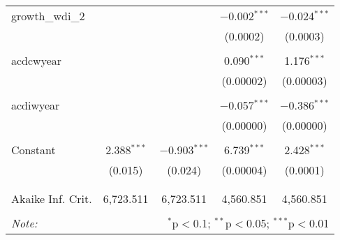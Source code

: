 \begin{table}[!htbp]
\begin{tabular}{@{\extracolsep{5pt}}lcccc}
 growth\_wdi\_2 &  &  & $-$0.002$^{***}$ & $-$0.024$^{***}$ \\ 
  &  &  & (0.0002) & (0.0003) \\ 
  & & & & \\ 
 acdcwyear &  &  & 0.090$^{***}$ & 1.176$^{***}$ \\ 
  &  &  & (0.00002) & (0.00003) \\ 
  & & & & \\ 
 acdiwyear &  &  & $-$0.057$^{***}$ & $-$0.386$^{***}$ \\ 
  &  &  & (0.00000) & (0.00000) \\ 
  & & & & \\ 
 Constant & 2.388$^{***}$ & $-$0.903$^{***}$ & 6.739$^{***}$ & 2.428$^{***}$ \\ 
  & (0.015) & (0.024) & (0.00004) & (0.0001) \\ 
  & & & & \\ 
\hline \\[-1.8ex] 
Akaike Inf. Crit. & 6,723.511 & 6,723.511 & 4,560.851 & 4,560.851 \\ 
\hline 
\hline \\[-1.8ex] 
\textit{Note:}  & \multicolumn{4}{r}{$^{*}$p$<$0.1; $^{**}$p$<$0.05; $^{***}$p$<$0.01} \\ 
\end{tabular} 
\end{table} 
